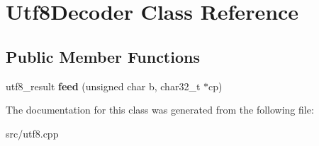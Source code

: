 \hypertarget{classUtf8Decoder}{}\section{Utf8\+Decoder Class Reference}
\label{classUtf8Decoder}
\subsection*{Public Member Functions}
\begin{DoxyCompactItemize}
\item 
\mbox{\label{classUtf8Decoder_a521a867992e93ee34ff387e3d7d360e1}} 
utf8\+\_\+result {\bfseries feed} (unsigned char b, char32\+\_\+t $\ast$cp)
\end{DoxyCompactItemize}


The documentation for this class was generated from the following file\+:\begin{DoxyCompactItemize}
\item 
src/utf8.\+cpp\end{DoxyCompactItemize}
